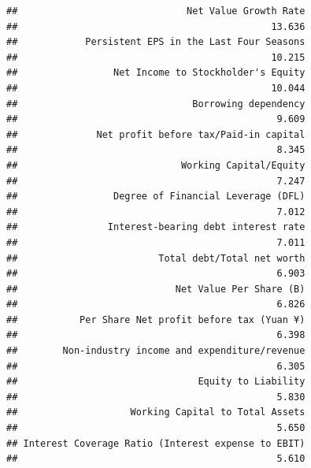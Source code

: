 \documentclass[
]{book}
\begin{document}
\begin{verbatim}
##                              Net Value Growth Rate 
##                                             13.636 
##            Persistent EPS in the Last Four Seasons 
##                                             10.215 
##                 Net Income to Stockholder's Equity 
##                                             10.044 
##                               Borrowing dependency 
##                                              9.609 
##              Net profit before tax/Paid-in capital 
##                                              8.345 
##                             Working Capital/Equity 
##                                              7.247 
##                 Degree of Financial Leverage (DFL) 
##                                              7.012 
##                Interest-bearing debt interest rate 
##                                              7.011 
##                         Total debt/Total net worth 
##                                              6.903 
##                            Net Value Per Share (B) 
##                                              6.826 
##           Per Share Net profit before tax (Yuan ¥) 
##                                              6.398 
##        Non-industry income and expenditure/revenue 
##                                              6.305 
##                                Equity to Liability 
##                                              5.830 
##                    Working Capital to Total Assets 
##                                              5.650 
## Interest Coverage Ratio (Interest expense to EBIT) 
##                                              5.610
\end{verbatim}
\end{document}
